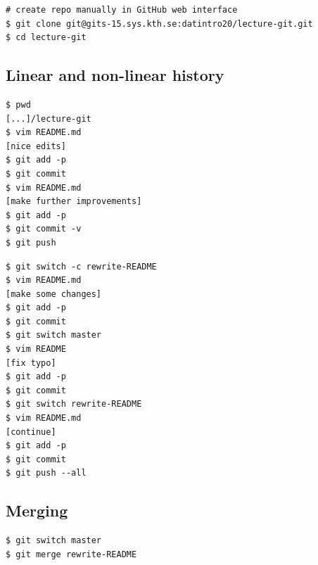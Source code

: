 \begin{frame}[fragile]
  \begin{example}
    \begin{lstlisting}
# create repo manually in GitHub web interface
$ git clone git@gits-15.sys.kth.se:datintro20/lecture-git.git
$ cd lecture-git
    \end{lstlisting}
  \end{example}
\end{frame}

\subsection{Linear and non-linear history}

\begin{frame}[fragile]
  \begin{example}[Linear]
    \begin{lstlisting}
$ pwd
[...]/lecture-git
$ vim README.md
[nice edits]
$ git add -p
$ git commit
$ vim README.md
[make further improvements]
$ git add -p
$ git commit -v
$ git push
    \end{lstlisting}
  \end{example}
\end{frame}

\begin{frame}[fragile]
  \begin{example}
    \begin{lstlisting}
$ git switch -c rewrite-README
$ vim README.md
[make some changes]
$ git add -p
$ git commit
$ git switch master
$ vim README
[fix typo]
$ git add -p
$ git commit
$ git switch rewrite-README
$ vim README.md
[continue]
$ git add -p
$ git commit
$ git push --all
    \end{lstlisting}
  \end{example}
\end{frame}

\subsection{Merging}

\begin{frame}[fragile]
  \begin{example}[Merging]
    \begin{lstlisting}
$ git switch master
$ git merge rewrite-README
    \end{lstlisting}
  \end{example}
\end{frame}

